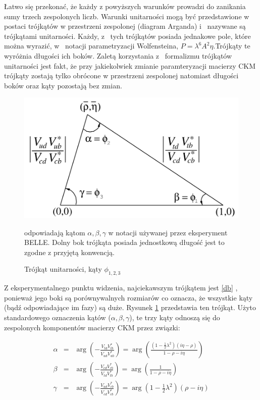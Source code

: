 Łatwo się przekonać, że każdy z powyższych warunków prowadzi do zanikania sumy trzech zespolonych liczb. Warunki unitarności mogą być przedstawione w postaci trójkątów w przestrzeni zespolonej (diagram Arganda) i~ nazywane są trójkątami unitarności. Każdy, z~ tych trójkątów posiada jednakowe pole, które można wyrazić, w~ notacji parametryzacji Wolfensteina, $P=\lambda^6A^2 \eta$.Trójkąty te wyróżnia długości ich boków.   Zaletą korzystania z~ formalizmu trójkątów unitarności jest fakt, że przy jakiekolwiek zmianie paramteryzacji macierzy CKM trójkąty zostają tylko obrócone w przestrzeni zespolonej natomiast długości boków oraz kąty pozostają bez zmian. 
 
 \begin{figure}[ht]
 \centering
 \includegraphics[scale=0.3]{rozdzial1/trojkat.png}
 \caption{Trójkąt unitarności, kąty $ \phi_{1,2,3}$} odpowiadają kątom $\alpha,\beta,\gamma$ w notacji używanej przez eksperyment BELLE. Dolny bok trójkąta posiada jednostkową długość jest to zgodne z przyjętą konwencją. \cite{PDG}
 \label{fig:trojkat db}
\end{figure}
 

Z eksperymentalnego punktu widzenia, najciekawszym trójkątem jest \ref{db} , ponieważ jego boki są porównywalnych rozmiarów co oznacza, że wszystkie kąty (bądź odpowiadające im fazy) są duże. Rysunek \ref{fig:trojkat db} przedstawia ten trójkąt. Użyto standardowego oznaczenia kątów ($\alpha , \beta , \gamma $), te trzy kąty odnoszą się do zespolonych komponentów macierzy CKM przez związki:

\begin{eqnarray}
\alpha &=& \arg \left(- \frac{V_{td}V^*_{tb}}{ V_{ud}V_{ub}^* }  \right) =\arg \left( \frac{(1-\frac{1}{2} \lambda^2)(i \eta -\rho )}{1-\rho -i\eta}  \right)\\
\beta &=& \arg \left(- \frac{V_{cd}V^*_{cb}}{ V_{td}V_{tb}^* }  \right) =\arg \left( \frac{1}{1-\rho -i\eta}  \right)\\
\gamma &=& \arg \left(- \frac{V_{ud}V^*_{cb}}{ V_{cd}V_{cb}^* }  \right) =\arg \left( 1-\frac{1}{2} \lambda^2 \right) \left( \rho -i \eta \right)
\end{eqnarray} 

